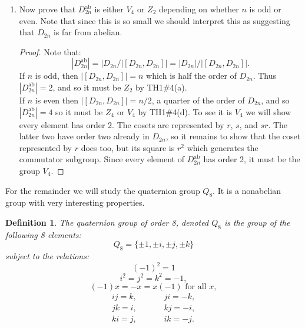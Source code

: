 \documentclass[11pt]{article}
\newtheorem{definition}{Definition}
\newcommand{\la}{\langle}
\newcommand{\ra}{\rangle}
\newcommand{\ab}{\mathrm{ab}}
\begin{document}
\begin{enumerate}
\begin{enumerate}
\begin{proof}
      so that in fact the commutator subgroup is $\la r\ra$.
    \end{proof}
    \item Now prove that $D_{2n}^\ab$ is either $V_4$ or $Z_2$ depending on whether $n$ is odd or even.  Note that since this is so small we should interpret this as suggesting that $D_{2n}$ is far from abelian.
    \begin{proof}
      Note that:
      \[|D_{2n}^\ab| = |D_{2n}/|[D_{2n},D_{2n}]| = |D_{2n}|/|[D_{2n},D_{2n}]|.\]
      If $n$ is odd, then $|[D_{2n},D_{2n}]| = n$ which is half the order of $D_{2n}$.  Thus $|D_{2n}^\ab| = 2$, and so it must be $Z_2$ by TH1\#4(a).\\

      If $n$ is even then $|[D_{2n},D_{2n}]| = n/2$, a quarter of the order of $D_{2n}$, and so $|D_{2n}^\ab| = 4$ so it must be $Z_4$ or $V_4$ by TH1\#4(d).  To see it is $V_4$ we will show every element has order 2.  The cosets are represented by $r$, $s$, and $sr$.  The latter two have order two already in $D_{2n}$, so it remains to show that the coset represented by $r$ does too, but its square is $r^2$ which generates the commutator subgroup. Since every element of $D_{2n}^\ab$ has order 2, it must be the group $V_4$.
    \end{proof}
  \end{enumerate}
\end{enumerate}
For the remainder we will study the quaternion group $Q_8$.  It is a nonabelian group with very interesting properties.
\begin{definition}
  The \textit{quaternion group of order 8}, denoted $Q_8$ is the group of the following 8 elements:
  \[Q_8 = \{\pm1,\pm i, \pm j, \pm k\}\]
  subject to the relations:
  \[(-1)^2 = 1\]
  \[i^2 = j^2 = k^2 = -1,\]
  \[(-1)x = -x = x(-1)\text{ for all }x,\]
  \begin{eqnarray*}
    ij = k, & \hspace{20pt} & ji = -k,\\
    jk = i, & \hspace{20pt} & kj = -i,\\
    ki = j, & \hspace{20pt} & ik = -j.
  \end{eqnarray*}
\end{definition}
\end{document}
